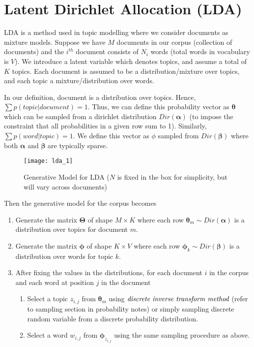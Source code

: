 \documentclass[../../statistical_learning_notes.tex]{subfiles}
\begin{document}
\section{Latent Dirichlet Allocation (LDA)}
LDA is a method used in topic modelling where we consider documents as mixture models. Suppose we have $M$ documents in our corpus (collection of documents) and the $i^{th}$ document consists of $N_{i}$ words (total words in vocabulary is $V$). We introduce a latent variable which denotes topics, and assume a total of $K$ topics. Each document is assumed to be a distribution/mixture over topics, and each topic a mixture/distribution over words. \newline

In our definition, document is a distribution over topics. Hence, $\sum p(topic|document) = 1$. Thus, we can define this probability vector as $\bm{\theta}$ which can be sampled from a dirichlet distribution $Dir(\bm{\alpha})$ (to impose the constraint that all probabilities in a given row sum to 1). Similarly, $\sum p(word|topic) = 1$. We define this vector as $\phi$ sampled from $Dir(\bm{\beta})$ where both $\bm{\alpha}$ and $\bm{\beta}$ are typically sparse.\newline

\begin{figure}[h]
\texttt{[image: lda\_1]}
\centering
\caption{Generative Model for LDA ($N$ is fixed in the box for simplicity, but will vary across documents)}
\label{fig:lda_1} %
\end{figure}


Then the generative model for the corpus becomes
\begin{enumerate}
    \item Generate the matrix $\bm{\Theta}$ of shape $M \times K$ where each row $\bm{\theta}_{m} \sim Dir(\bm{\alpha})$ is a distribution over topics for document $m$.
    \item Generate the matrix $\bm{\phi}$ of shape $K \times V$ where each row $\bm{\phi}_{k} \sim Dir(\bm{\beta})$ is a distribution over words for topic $k$.
    \item After fixing the values in the distributions, for each document $i$ in the corpus and each word at position $j$ in the document
    \begin{enumerate}
        \item Select a topic $z_{i,j}$ from $\bm{\theta}_{m}$ using $\emph{discrete inverse transform method}$ (refer to sampling section in probability notes) or simply sampling discrete random variable from a discrete probability distribution.
        \item Select a word $w_{i,j}$ from $\bm{\phi}_{z_{i,j}}$ using the same sampling procedure as above.
    \end{enumerate}
\end{enumerate}
\end{document}
